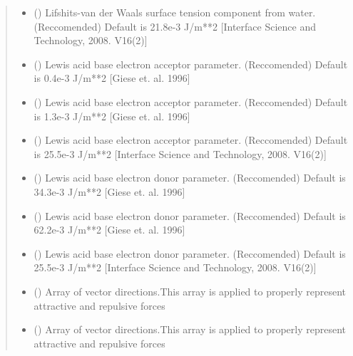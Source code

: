 \documentclass[letterpaper,10pt,english]{sphinxmanual}
\begin{document}
\begin{fulllineitems}
\begin{quote}
\begin{description}
\begin{itemize}
\item {} 
 () \textendash{} Lifshits-van der Waals surface tension component from water. (Reccomended)
Default is 21.8e-3 J/m**2 {[}Interface Science and Technology, 2008. V16(2){]}

\item {} 
 () \textendash{} Lewis acid base electron acceptor parameter. (Reccomended)
Default is 0.4e-3 J/m**2 {[}Giese et. al. 1996{]}

\item {} 
 () \textendash{} Lewis acid base electron acceptor parameter. (Reccomended)
Default is 1.3e-3 J/m**2 {[}Giese et. al. 1996{]}

\item {} 
 () \textendash{} Lewis acid base electron acceptor parameter. (Reccomended)
Default is 25.5e-3 J/m**2 {[}Interface Science and Technology, 2008. V16(2){]}

\item {} 
 () \textendash{} Lewis acid base electron donor parameter. (Reccomended)
Default is 34.3e-3 J/m**2 {[}Giese et. al. 1996{]}

\item {} 
 () \textendash{} Lewis acid base electron donor parameter. (Reccomended)
Default is 62.2e-3 J/m**2 {[}Giese et. al. 1996{]}

\item {} 
 () \textendash{} Lewis acid base electron donor parameter. (Reccomended)
Default is 25.5e-3 J/m**2 {[}Interface Science and Technology, 2008. V16(2){]}

\item {} 
 () \textendash{} Array of vector directions.This array is applied to properly represent attractive
and repulsive forces

\item {} 
 () \textendash{} Array of vector directions.This array is applied to properly represent attractive
and repulsive forces


\end{itemize}
\end{description}
\end{quote}
\end{fulllineitems}
\end{document}
